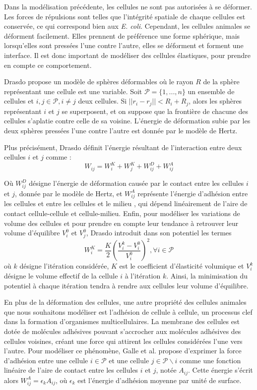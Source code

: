 \documentclass[11pt,a4paper]{article}
\begin{document}
Dans la modélisation précédente, les cellules ne sont pas autorisées à se déformer. Les forces de répulsions sont telles que l'intégrité spatiale de chaque cellules est conservée, ce qui correspond bien aux \emph{E. coli}. Cependant, les cellules animales se déforment facilement. Elles prennent de préférence une forme sphérique, mais lorsqu'elles sont pressées l'une contre l'autre, elles se déforment et forment une interface. Il est donc important de modéliser des cellules élastiques, pour prendre en compte ce comportement. 

Drasdo \cite{drasdo2005single} propose un modèle de sphères déformables où le rayon $R$ de la sphère représentant une cellule est une variable. Soit $\mathcal{P} = \{1,...,n\}$ un ensemble de cellules et $i,j \in \mathcal{P}, i \ne j$ deux cellules. Si $||r_i - r_j|| < R_i + R_j$, alors les sphères représentant $i$ et $j$ se superposent, et on suppose que la frontière de chacune des cellules s'aplatie contre celle de sa voisine. L'énergie de déformation subie par les deux sphères pressées l'une contre l'autre est donnée par le modèle de Hertz. 

Plus précisément, Drasdo définit l'énergie résultant de l'interaction entre deux cellules $i$ et $j$ comme : $$W_{ij} = W_{i}^K + W_{j}^K + W_{ij}^D + W_{ij}^A  $$

Où $W_{ij}^D$ désigne l'énergie de déformation causée par le contact entre les cellules $i$ et $j$, donnée par le modèle de Hertz, et $W_{ij}^A$ représente l'énergie d'adhésion entre les cellules et entre les cellules et le milieu , qui dépend linéairement de l'aire de contact cellule-cellule et cellule-milieu. Enfin, pour modéliser les variations de volume des cellules et pour prendre en compte leur tendance à retrouver leur volume d'équilibre $V^0_i$ et $V^0_j$, Drasdo introduit dans son potentiel les termes $$W_i^K = \frac{K}{2}(\frac{V_i^k-V_i^0}{V_i^0})^2, \forall i \in \mathcal{P}$$ où $k$ désigne l'itération considérée, $K$ est le coefficient d'élasticité volumique et $V_i^k$ désigne le volume effectif de la cellule $i$ à l'itération $k$. Ainsi, la minimisation du potentiel à chaque itération tendra à rendre aux cellules leur volume d'équilibre.

En plus de la déformation des cellules, une autre propriété des cellules animales que nous souhaitons modéliser est l'adhésion de cellule à cellule, un processus clef dans la formation d'organismes multicellulaires. La membrane des cellules est dotée de molécules adhésives pouvant s'accrocher aux molécules adhésives des cellules voisines, créant une force qui attirent les cellules considérées l'une vers l'autre. Pour modéliser ce phénomène, Galle et al. \cite{galle2005modeling} propose d'exprimer la force d'adhésion entre une cellule $i \in \mathcal{P}$ et une cellule $j\in \mathcal{P}\backslash i$  comme une fonction linéaire de l'aire de contact entre les cellules $i$ et $j$, notée $A_{ij}$. Cette énergie s'écrit alors $W_{ij}^A = \epsilon_k A_{ij}$, où $\epsilon_k$ est l'énergie d'adhésion moyenne par unité de surface. 
\end{document}
